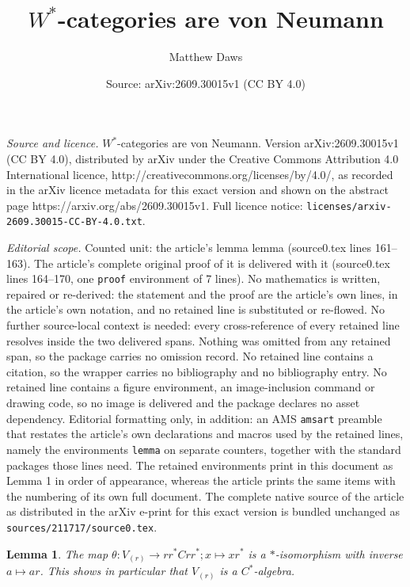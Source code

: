 \documentclass[10pt,a4paper]{amsart}
\title{$W^*$-categories are von Neumann}
\author{Matthew Daws}
\date{Source: arXiv:2609.30015v1 (CC BY 4.0)}
\newtheorem{lemma}{Lemma}
\begin{document}
\maketitle

\noindent\emph{Source and licence.} $W^*$-categories are von Neumann. Version arXiv:2609.30015v1 (CC BY 4.0), distributed by arXiv under the Creative Commons Attribution 4.0 International licence, http://creativecommons.org/licenses/by/4.0/, as recorded in the arXiv licence metadata for this exact version and shown on the abstract page https://arxiv.org/abs/2609.30015v1. Full licence notice: \texttt{licenses/arxiv-2609.30015-CC-BY-4.0.txt}.\par\smallskip

\noindent\textit{Editorial scope.} Counted unit: the article's lemma lemma (source0.tex lines 161--163). The article's complete original proof of it is delivered with it (source0.tex lines 164--170, one \texttt{proof} environment of 7 lines). No mathematics is written, repaired or re-derived: the statement and the proof are the article's own lines, in the article's own notation, and no retained line is substituted or re-flowed.  No further source-local context is needed: every cross-reference of every retained line resolves inside the two delivered spans.  Nothing was omitted from any retained span, so the package carries no omission record.  No retained line contains a citation, so the wrapper carries no bibliography and no bibliography entry.  No retained line contains a figure environment, an image-inclusion command or drawing code, so no image is delivered and the package declares no asset dependency.  Editorial formatting only, in addition: an AMS \texttt{amsart} preamble that restates the article's own declarations and macros used by the retained lines, namely the environments \texttt{lemma} on separate counters, together with the standard packages those lines need.  The retained environments print in this document as Lemma 1 in order of appearance, whereas the article prints the same items with the numbering of its own full document.  The complete native source of the article as distributed in the arXiv e-print for this exact version is bundled unchanged as \texttt{sources/211717/source0.tex}.
\begin{lemma}
The map $\theta \colon V_{(r)} \to rr^* C rr^*; x \mapsto xr^*$ is a $*$-isomorphism with inverse $a\mapsto ar$.  This shows in particular that $V_{(r)}$ is a $C^*$-algebra.
\end{lemma}
\end{document}
